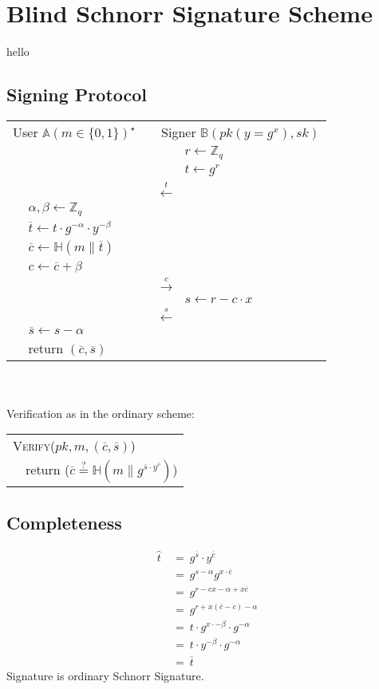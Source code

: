 \documentclass{report}
\begin{document}
\section{Blind Schnorr Signature Scheme}
\begin{adjustwidth}{2em}{2em}
	hello
	\subsection{Signing Protocol}
	\begin{tabular}{lllll}
		\multicolumn{2}{l}{User $\mathbb{A} (m \in \{0,1\})^{\star}$} & & \multicolumn{2}{l}{Signer $\mathbb{B} (pk (y = g^x), sk)$} \\
		& & & & $r \leftarrow \mathbb{Z}_q$ \\
		& & & & $t \leftarrow g^r$ \\
		\multicolumn{5}{c}{$\stackrel{t}{\longleftarrow}$} \\
		& $\alpha , \beta \leftarrow \mathbb{Z}_q$ \\
		& $\overline{t} \leftarrow t \cdot g^{-\alpha} \cdot y^{-\beta}$ \\
		& $\overline{c} \leftarrow \mathbb{H}(m \| \overline{t})$ \\
		& $c \leftarrow \overline{c} + \beta$ \\
		\multicolumn{5}{c}{$\stackrel{c}{\longrightarrow}$} \\		
		& & & & $s \leftarrow r - c \cdot x$ \\
		\multicolumn{5}{c}{$\stackrel{s}{\longleftarrow}$} \\
		& $\overline{s} \leftarrow s - \alpha$ \\
		& return $(\overline{c}, \overline{s})$
	\end{tabular} \\
	\hfill \\
	Verification as in the ordinary scheme:
	\begin{tabular}{ll}
		\multicolumn{2}{l}{\textsc{Verify}($pk, m, (\overline{c}, \overline{s})$)} \\
		& return ($\overline{c} \stackrel{?}{=} \mathbb{H}(m \| g^{\overline{s} \cdot y^{\overline{c}}})$) \\
	\end{tabular}
	\subsection{Completeness}
	\begin{align*}
		\hat{t} \ & = \ g^{\overline{s}} \cdot y^{\overline{c}} \\
		& = \ g^{s- \alpha} g^{x \cdot \overline{c}} \\
		& = \ g^{r - cx - \alpha + x \overline{c}} \\
		& = \ g^{r + x(\overline{c} - c) - \alpha} \\
		& = \ t \cdot g^{x \cdot -\beta} \cdot g^{-\alpha} \\
		& = \ t \cdot y^{-\beta} \cdot g^{- \alpha} \\
		& = \ \overline{t}
	\end{align*}
	Signature is ordinary Schnorr Signature.

\end{adjustwidth}
\end{document}
